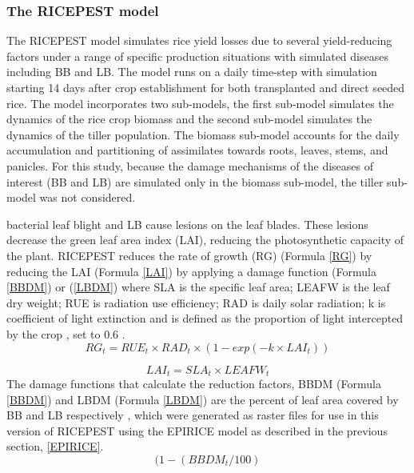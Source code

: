    \subsubsection{The RICEPEST model}\label{RICEPEST}
    The RICEPEST model \citep{Willocquet2000,Willocquet2002} simulates rice yield losses due to several yield-reducing factors under a range of specific production situations with simulated diseases including BB and LB. The model runs on a daily time-step with simulation starting 14 days after crop establishment for both transplanted and direct seeded rice. The model incorporates two sub-models, the first sub-model simulates the dynamics of the rice crop biomass and the second sub-model simulates the dynamics of the tiller population. The biomass sub-model accounts for the daily accumulation and partitioning of assimilates towards roots, leaves, stems, and panicles. For this study, because the damage mechanisms of the diseases of interest (BB and LB) are simulated only in the biomass sub-model, the tiller sub-model was not considered.
    
    bacterial leaf blight and LB cause lesions on the leaf blades. These lesions decrease the green leaf area index (LAI), reducing the photosynthetic capacity of the plant. RICEPEST reduces the rate of growth (RG) (Formula \ref{RG}) by reducing the LAI (Formula \ref{LAI}) by applying a damage function (Formula \ref{BBDM}) or (\ref{LBDM}) where SLA is the specific leaf area; LEAFW is the leaf dry weight; RUE is radiation use efficiency; RAD is daily solar radiation; k is coefficient of light extinction and is defined as the proportion of light intercepted by the crop \citep{Willocquet2000}, set to 0.6 \citep{Willocquet2002}.
    \begin{equation}
    RG_t = RUE_t \times RAD_t \times (1- exp(- k \times LAI_t))
    \label{RG}
    \end{equation}
    
    \begin{equation}
    LAI_t = SLA_t \times LEAFW_t
    \label{LAI}
    \end{equation}
    The damage functions that calculate the reduction factors, BBDM (Formula \ref{BBDM}) and LBDM (Formula \ref{LBDM}) are the percent of leaf area covered by BB and LB respectively \citep{Willocquet2002}, which were generated as raster files for use in this version of RICEPEST using the EPIRICE model as described in the previous section, \ref{EPIRICE}. 
    \begin{equation}
    (1-(BBDM_t /100)
    \label{BBDM}
    \end{equation}
    
